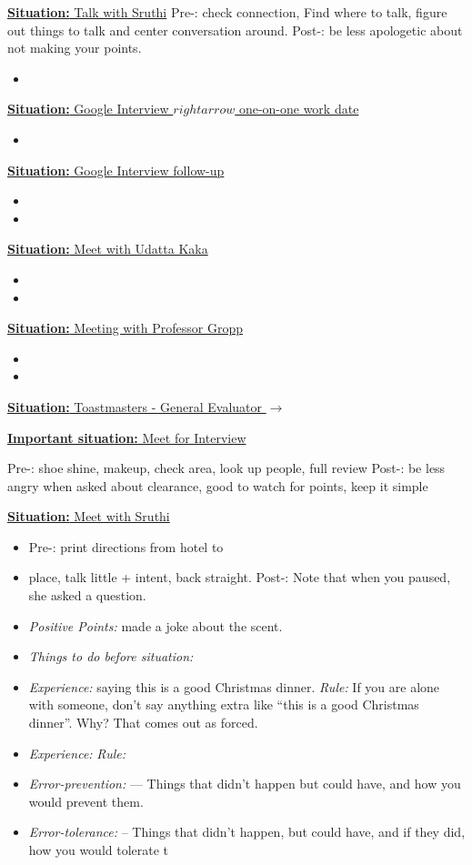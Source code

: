 \documentclass[11pt]{article}
\newcommand{\newSituation}[1]{\underline{\textbf{Situation:} #1} }
\newcommand{\newImportantSituation}[1]{\underline{\textbf{Important situation:} #1} }
\begin{document}
{\newSituation{Talk with Sruthi}
Pre-: check connection, Find where to talk, figure out things to talk
and center conversation around. Post-: be less apologetic about not
making your points.
\begin{itemize} 
\tiny \item \tiny 
\end{itemize} 


\newSituation{Google Interview $rightarrow$ one-on-one work date} 
\begin{itemize} 
\tiny \item \tiny 
\end{itemize} 

\newSituation{Google Interview follow-up} 
\begin{itemize} 
\item 
\item 
\end{itemize}

\newSituation{Meet with Udatta Kaka} 
\begin{itemize} 
\item 
\item 
\end{itemize}

\newSituation{Meeting with Professor Gropp} 
\begin{itemize} 
\item 
\item 
\end{itemize}

\newSituation{Toastmasters - General Evaluator $\rightarrow$} 

\newImportantSituation{Meet for Interview} 
\begin{itemize} 
Pre-:  shoe shine, makeup, check area, look up people, full review
Post-: be less angry when asked about clearance, good to watch for
points, keep it simple 
\end{itemize} 

\newSituation{ Meet with Sruthi}
\begin{itemize} 
\item \tiny Pre-: print directions from hotel to
\item \tiny place, talk little + intent, back straight.   Post-: Note that when
you paused, she asked a question. 
\item \textit{Positive Points:} made a joke about the scent.
\item \textit{Things to do before situation:}
\item \textit{Experience:} saying this is a good Christmas dinner.
  \textit{Rule:} If you are alone with someone, don't say anything
  extra like
  ``this is a good Christmas dinner''. Why? That comes out as forced.
\item \textit{Experience:}  \textit{Rule:}
\item \textit{Error-prevention:}  ---  Things that didn't happen but
  could have, and how you would prevent them.
\item \textit{Error-tolerance:} -- Things that didn't happen, but
  could have, and if they did, how you would tolerate t
\end{itemize} 

}
\end{document}
